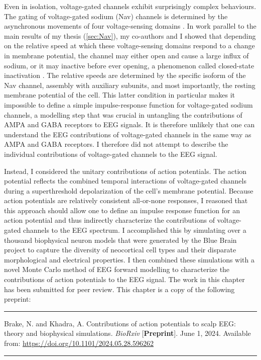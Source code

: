 Even in isolation, voltage-gated channels exhibit surprisingly complex behaviours. The gating of voltage-gated sodium (Nav) channels is determined by the asynchronous movements of four voltage-sensing domains \cite{Ahern2016}. In work parallel to the main results of my thesis  (\autoref{sec:Nav}), my co-authors and I showed that depending on the relative speed at which these voltage-sensing domains respond to a change in membrane potential, the channel may either open and cause a large influx of sodium, or it may inactive before ever opening, a phenomenon called closed-state inactivation \cite{Brake2022,Armstrong2006}. The relative speeds are determined by the specific isoform of the Nav channel, assembly with auxiliary subunits, and most importantly, the resting membrane potential of the cell. This latter condition in particular makes it impossible to define a simple impulse-response function for voltage-gated sodium channels, a modelling step that was crucial in untangling the contributions of AMPA and GABA receptors to EEG signals. It is therefore unlikely that one can understand the EEG contributions of voltage-gated channels in the same way as AMPA and GABA receptors. I therefore did not attempt to describe the individual contributions of voltage-gated channels to the EEG signal.

Instead, I considered the unitary contributions of action potentials. The action potential reflects the combined temporal interactions of voltage-gated channels during a superthreshold depolarization of the cell's membrane potential. Because action potentials are relatively consistent all-or-none responses, I reasoned that this approach should allow one to define an impulse response function for an action potential and thus indirectly characterize the contributions of voltage-gated channels to the EEG spectrum. I accomplished this by simulating over a thousand biophysical neuron models that were generated by the Blue Brain project \cite{Markram2015} to capture the diversity of neocortical cell types and their disparate morphological and electrical properties. I then combined these simulations with a novel Monte Carlo method of EEG forward modelling to characterize the contributions of action potentials to the EEG signal. The work in this chapter has been submitted for peer review. This chapter is a copy of the following preprint:

\vspace{1em}
\hrule
\vspace{.5em}
\noindent
\hangindent=1cm
Brake, N. and Khadra, A. Contributions of action potentials to scalp EEG: theory and biophysical simulations. \textit{BioRxiv} [\textbf{Preprint}]. June 1, 2024. Available from: \url{https://doi.org/10.1101/2024.05.28.596262}
\vspace{.75em}
\hrule
\vspace{.65em}

